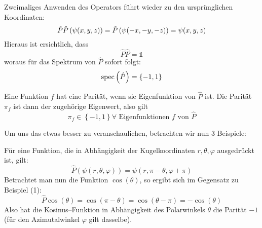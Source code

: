\documentclass[Ex4_Zusammenfassung.tex]{subfiles}
\begin{document}
Zweimaliges Anwenden des Operators führt wieder zu den ursprünglichen Koordinaten:
\begin{equation}
	\hat{P} \hat{P} \left( \psi(x,y,z) \right) = \hat{P} \left( \psi(-x,-y,-z) \right) = \psi (x,y,z)
\end{equation}
Hieraus ist ersichtlich, dass 
\begin{equation}
	\hat{P} \hat{P} = \mathds{1}
\end{equation}
woraus für das Spektrum von $\hat{P}$ sofort folgt:
\begin{equation}
	\mathrm{spec}\left( \hat{P} \right) = \left\{-1,1\right\}
\end{equation}
\begin{tcolorbox}[title=Definition]
	Eine Funktion $f$ hat eine Parität, wenn sie Eigenfunktion von $\hat{P}$ ist. Die Parität $\pi_f$ ist dann der zugehörige Eigenwert, also gilt
	\begin{equation}
		\pi_f \in \left\{ -1,1\right\} \forall \text{ Eigenfunktionen } f \text{ von } \hat{P}
	\end{equation}
\end{tcolorbox}

Um uns das etwas besser zu veranschaulichen, betrachten wir nun 3 Beispiele:

Für eine Funktion, die in Abhängigkeit der Kugelkoordinaten $r,\theta,\varphi$ ausgedrückt ist, gilt:
\begin{equation}
	\hat{P}(\psi(r,\theta,\varphi)) = \psi(r,\pi-\theta, \varphi+\pi)
\end{equation}
Betrachtet man nun die Funktion $\cos (\theta) $, so ergibt sich im Gegensatz zu Beispiel (1):
\begin{equation*}
	\hat{P} \cos (\theta) = \cos (\pi-\theta) = \cos (\theta-\pi) = -\cos(\theta)
\end{equation*}
Also hat die Kosinus--Funktion in Abhängigkeit des Polarwinkels $\theta$ die Parität $-1$ (für den Azimutalwinkel $\varphi$ gilt dasselbe).
\end{document}
